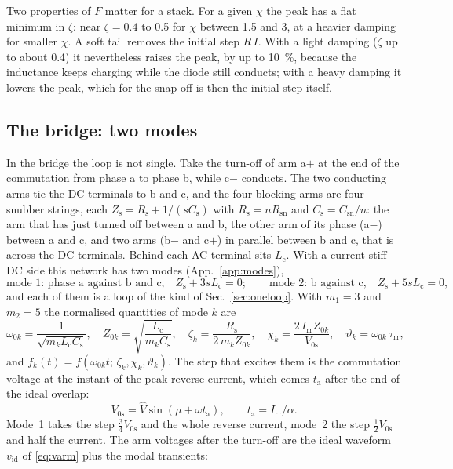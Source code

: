 \documentclass[10pt,a4paper]{scrartcl}
\newcommand{\Irr}{I_\mathrm{rr}}
\newcommand{\Csn}{C_\mathrm{sn}}
\newcommand{\Rsn}{R_\mathrm{sn}}
\newcommand{\Cs}{C_\mathrm{s}}
\newcommand{\Rs}{R_\mathrm{s}}
\newcommand{\Zs}{Z_\mathrm{s}}
\newcommand{\Lc}{L_\mathrm{c}}
\newcommand{\Vos}{V_\mathrm{0s}}
\newcommand{\Vh}{\hat V}
\newcommand{\ta}{t_\mathrm{a}}
\newcommand{\trr}{\tau_\mathrm{rr}}
\begin{document}
Two properties of $F$ matter for a stack. For a given $\chi$ the peak has a flat minimum in $\zeta$: near $\zeta = 0.4$ to 0.5 for $\chi$ between 1.5 and 3, at a heavier damping for smaller $\chi$. A soft tail removes the initial step $R\,I$. With a light damping ($\zeta$ up to about 0.4) it nevertheless raises the peak, by up to \SI{10}{\percent}, because the inductance keeps charging while the diode still conducts; with a heavy damping it lowers the peak, which for the snap-off is then the initial step itself.

\subsection{The bridge: two modes}
\label{sec:modes}
In the bridge the loop is not single. Take the turn-off of arm a$+$ at the end of the commutation from phase a to phase b, while c$-$ conducts. The two conducting arms tie the DC terminals to b and c, and the four blocking arms are four snubber strings, each $\Zs = \Rs + 1/(s\Cs)$ with $\Rs = n\Rsn$ and $\Cs = \Csn/n$: the arm that has just turned off between a and b, the other arm of its phase (a$-$) between a and c, and two arms (b$-$ and c$+$) in parallel between b and c, that is across the DC terminals. Behind each AC terminal sits $\Lc$. With a current-stiff DC side this network has two modes (App.~\ref{app:modes}),
\begin{equation}
\text{mode 1: phase a against b and c,}\quad \Zs + 3s\Lc = 0; \qquad
\text{mode 2: b against c,}\quad \Zs + 5s\Lc = 0 ,
\end{equation}
and each of them is a loop of the kind of Sec.~\ref{sec:oneloop}. With $m_1 = 3$ and $m_2 = 5$ the normalised quantities of mode $k$ are
\begin{equation}
\omega_{0k} = \frac{1}{\sqrt{m_k\Lc\Cs}}, \quad Z_{0k} = \sqrt{\frac{\Lc}{m_k\Cs}}, \quad \zeta_k = \frac{\Rs}{2\,m_k Z_{0k}}, \quad \chi_k = \frac{2\,\Irr Z_{0k}}{\Vos}, \quad \vartheta_k = \omega_{0k}\,\trr ,
\label{eq:modes}
\end{equation}
and $f_k(t) = f(\omega_{0k}t;\,\zeta_k,\chi_k,\vartheta_k)$. The step that excites them is the commutation voltage at the instant of the peak reverse current, which comes $\ta$ after the end of the ideal overlap:
\begin{equation}
\Vos = \Vh\sin(\mu + \omega\ta), \qquad \ta = \Irr/\alpha .
\label{eq:V0s}
\end{equation}
Mode~1 takes the step $\tfrac34\Vos$ and the whole reverse current, mode~2 the step $\tfrac12\Vos$ and half the current. The arm voltages after the turn-off are the ideal waveform $v_\mathrm{id}$ of \eqref{eq:varm} plus the modal transients:
\end{document}
